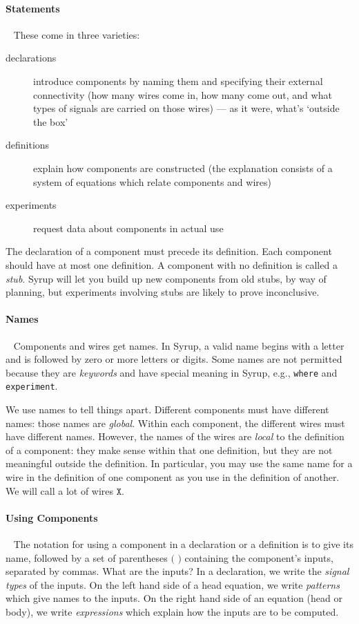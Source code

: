 \documentclass{article}
\begin{document}
\paragraph{Statements}~ These come in three varieties:
\begin{description}
\item[declarations] introduce components by naming them and specifying their external connectivity (how many wires come in, how many come out, and what types of signals are carried on those wires) --- as it were, what's `outside the box'
\item[definitions] explain how components are constructed (the explanation consists of a system of equations which relate components and wires)
\item[experiments] request data about components in actual use
\end{description}

The declaration of a component must precede its definition. Each component should have at most one definition. A component with no definition is called a \emph{stub}. Syrup will let you build up new components from old stubs, by way of planning, but experiments involving stubs are likely to prove inconclusive.

\paragraph{Names}~ Components and wires get names. In Syrup, a valid name begins with a letter and is followed by zero or more letters or digits. Some names are not permitted because they are \emph{keywords} and have special meaning in Syrup, e.g., \texttt{where} and \texttt{experiment}.

We use names to tell things apart. Different components must have
different names: those names are \emph{global}. Within each component, the different wires must have different names. However, the names of the wires are \emph{local} to the definition of a component: they make sense within that one definition, but they are not meaningful outside the definition. In particular, you may use the same name for a wire in the definition of one component as you use in the definition of another. We will call a lot of wires $\texttt{X}$.

\paragraph{Using Components}~ The notation for using a component in a
declaration or a definition is to give its name, followed by a set of
parentheses $\texttt{( )}$ containing the component's inputs,
separated by commas. What are the inputs? In a declaration, we write
the \emph{signal types} of the inputs. On the left hand side of a
head equation, we write \emph{patterns} which give names to the
inputs. On the right hand side of an equation (head or body), we write
\emph{expressions} which explain how the inputs are to be computed.
\end{document}
